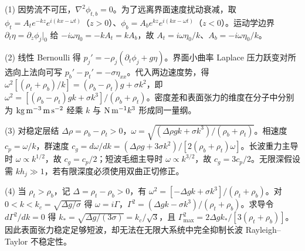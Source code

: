 (1) 因势流不可压，\(\nabla^2\phi_{t,b}=0\)。为了远离界面速度扰动衰减，取 \(\phi_t=A_t e^{-kz}e^{i(kx-\omega t)}\)（\(z>0\)）、\(\phi_b=A_b e^{kz}e^{i(kx-\omega t)}\)（\(z<0\)）。运动学边界 \(\partial_t\eta=\partial_z\phi_j|_0\) 给 \(-i\omega\eta_0=-kA_t=kA_b\)，故 \(A_t=i\omega\eta_0/k\)、\(A_b=-i\omega\eta_0/k\)。

(2) 线性 Bernoulli 得 \(p_j'=-\rho_j(\partial_t\phi_j+g\eta)\)。界面小曲率 Laplace 压力跃变对所选向上法向可写 \(p_b'-p_t'=-\sigma\eta_{xx}\)。代入两边速度势，得 \(\omega^2[(\rho_t+\rho_b)/k]=(\rho_b-\rho_t)g+\sigma k^2\)，即 \(\omega^2=[(\rho_b-\rho_t)gk+\sigma k^3]/(\rho_b+\rho_t)\)。密度差和表面张力的维度在分子中分别为 \({\rm kg\,m^{-3}\,m\,s^{-2}}\) 经乘 \(k\) 与 \({\rm N\,m^{-1}}k^3\) 形成同一量纲。

(3) 对稳定层结 \(\Delta\rho=\rho_b-\rho_t>0\)，\(\omega=\sqrt{(\Delta\rho gk+\sigma k^3)/(\rho_b+\rho_t)}\)。相速度 \(c_p=\omega/k\)，群速度 \(c_g=d\omega/dk=(\Delta\rho g+3\sigma k^2)/[2(\rho_b+\rho_t)\omega]\)。长波重力主导时 \(\omega\propto k^{1/2}\)，故 \(c_g=c_p/2\)；短波毛细主导时 \(\omega\propto k^{3/2}\)，故 \(c_g=3c_p/2\)。无限深假设需 \(kh_j\gg1\)，若有限深度必须使用双曲正切修正。

(4) 当 \(\rho_t>\rho_b\)，记 \(\Delta=\rho_t-\rho_b>0\)，有 \(\omega^2=[-\Delta g k+\sigma k^3]/(\rho_t+\rho_b)\)。对 \(0<k<k_c=\sqrt{\Delta g/\sigma}\) 得 \(\omega=i\Gamma\)，\(\Gamma^2=(\Delta gk-\sigma k^3)/(\rho_t+\rho_b)\)。求导令 \(d\Gamma^2/dk=0\) 得 \(k_*=\sqrt{\Delta g/(3\sigma)}=k_c/\sqrt3\)，且 \(\Gamma_{\max}^2=2\Delta gk_*/[3(\rho_t+\rho_b)]\)。因此表面张力稳定足够短波，却无法在无限大系统中完全抑制长波 Rayleigh--Taylor 不稳定性。
